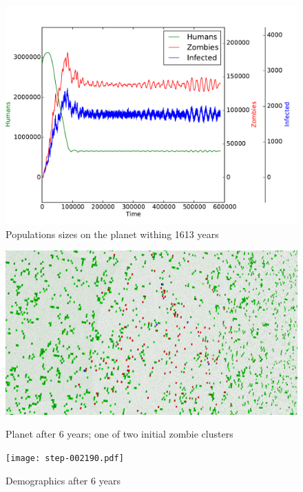\documentclass[a4paper]{article}
\begin{document}
\begin{figure}[ht]
    \centering
    \includegraphics[width=\textwidth]{torus/planet.pdf}
    \caption{Populations sizes on the planet withing 1613 years}
\end{figure}

\begin{figure}[pht]
    \centering
    \includegraphics[width=\textwidth]{torus/step-002190-torus.png}
    \caption{Planet after 6 years; one of two initial zombie clusters}
    \texttt{[image: step-002190.pdf]}
    \caption{Demographics after 6 years}
\end{figure}
\end{document}
